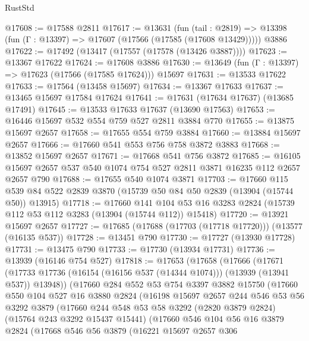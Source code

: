 \begin{lexlean}{RustStd}
\begin{coremodule}
@17608 := @17588 @2811
@17617 := @13631
    (fun (tail : @2819) => @13398 (fun (Γ : @13397) => @17607 (@17566 (@17585 (@17608 @13429)))))
    @3886
@17622 := @17492 (@13417 (@17557 (@17578 (@13426 @3887))))
@17623 := @13367 @17622
@17624 := @17608 @3886
@17630 := @13649 (fun (Γ : @13397) => @17623 (@17566 (@17585 @17624))) @15697
@17631 := @13533 @17622
@17633 := @17564 (@13458 @15697)
@17634 := @13367 @17633
@17637 := @13465 @15697 @17584 @17624
@17641 := @17631 (@17634 @17637) (@13685 @17491)
@17645 := @13533 @17633 @17637 (@13690 @17563)
@17653 := @16446 @15697 @532 @554 @759 @527 @2811 @3884 @770
@17655 := @13875 @15697 @2657
@17658 := @17655 @554 @759 @3884
@17660 := @13884 @15697 @2657
@17666 := @17660 @541 @553 @756 @758 @3872 @3883
@17668 := @13852 @15697 @2657
@17671 := @17668 @541 @756 @3872
@17685 := @16105 @15697 @2657 @537 @540 @1074 @754 @527 @2811 @3871 @16235 @112 @2657 @2657 @790
@17688 := @17655 @540 @1074 @3871
@17703 := @17660
    @115
    @539
    @84
    @522
    @2839
    @3870
    (@15739 @50 @84 @50 @2839 (@13904 (@15744 @50)) @13915)
@17718 := @17660
    @141
    @104
    @53
    @16
    @3283
    @2824
    (@15739 @112 @53 @112 @3283 (@13904 (@15744 @112)) @15418)
@17720 := @13921 @15697 @2657
@17727 := @17685 (@17688 (@17703 (@17718 @17720))) (@13577 (@16135 @537))
@17728 := @13451 @790
@17730 := @17727 (@13930 @17728)
@17731 := @13475 @790
@17733 := @17730 (@13934 @17731)
@17736 := @13939 (@16146 @754 @527)
@17818 := @17653
    (@17658
      (@17666
        (@17671 (@17733 @17736 (@16154 (@16156 @537 (@14344 @1074))) (@13939 (@13941 @537)) @13948))
        (@17660
          @284
          @552
          @53
          @754
          @3397
          @3882
          @15750
          (@17660
            @550
            @104
            @527
            @16
            @3880
            @2824
            (@16198
              @15697
              @2657
              @244
              @546
              @53
              @56
              @3292
              @3879
              (@17660
                @244
                @548
                @53
                @58
                @3292
                (@2820 @3879 @2824)
                (@15764 @243 @3292 @15437 @15441)
                (@17660
                  @546
                  @104
                  @56
                  @16
                  @3879
                  @2824
                  (@17668
                    @546
                    @56
                    @3879
                    (@16221
                      @15697
                      @2657
                      @306

\end{coremodule}
\end{lexlean}
